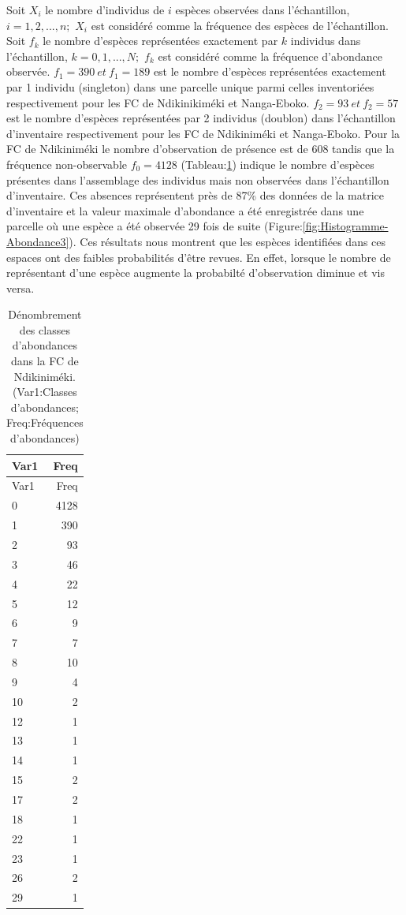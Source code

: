 \documentclass[
  12pt,
  a4paper,
  extrafontsizes,
  onecolumn,
  openright]{book}
\theoremstyle{definition}
\theoremstyle{definition}
\theoremstyle{definition}
\theoremstyle{definition}
\theoremstyle{remark}
\begin{document}
Soit \(X_i\) le nombre d'individus de \(i\) espèces observées dans l'échantillon, \(i=1,2,...,n;\) \(X_i\) est considéré comme la fréquence des espèces de l'échantillon. Soit \(f_k\) le nombre d'espèces représentées exactement par \(k\) individus dans l'échantillon, \(k=0,1,...,N;\) \(f_k\) est considéré comme la fréquence d'abondance observée. \(f_1=390\ et\ f_1=189\) est le nombre d'espèces représentées exactement par 1 individu (singleton) dans une parcelle unique parmi celles inventoriées respectivement pour les FC de Ndikinikiméki et Nanga-Eboko. \(f_2=93\ et\ f_2=57\) est le nombre d'espèces représentées par 2 individus (doublon) dans l'échantillon d'inventaire respectivement pour les FC de Ndikiniméki et Nanga-Eboko. Pour la FC de Ndikiniméki le nombre d'observation de présence est de 608 tandis que la fréquence non-observable \(f_0=4128\) (Tableau:\ref{tab:ClassesAbondance-Ndikinimeki3}) indique le nombre d'espèces présentes dans l'assemblage des individus mais non observées dans l'échantillon d'inventaire. Ces absences représentent près de 87\% des données de la matrice d'inventaire et la valeur maximale d'abondance a été enregistrée dans une parcelle où une espèce a été observée 29 fois de suite (Figure:\ref{fig:Histogramme-Abondance3}). Ces résultats nous montrent que les espèces identifiées dans ces espaces ont des faibles probabilités d'être revues. En effet, lorsque le nombre de représentant d'une espèce augmente la probabilté d'observation diminue et vis versa.

\begin{longtable}[]{@{}lr@{}}
\caption{\label{tab:ClassesAbondance-Ndikinimeki3}Dénombrement des classes d'abondances dans la FC de Ndikiniméki. (Var1:Classes d'abondances; Freq:Fréquences d'abondances)}\tabularnewline
\toprule()
Var1 & Freq \\
\midrule()
\endfirsthead
\toprule()
Var1 & Freq \\
\midrule()
\endhead
0 & 4128 \\
1 & 390 \\
2 & 93 \\
3 & 46 \\
4 & 22 \\
5 & 12 \\
6 & 9 \\
7 & 7 \\
8 & 10 \\
9 & 4 \\
10 & 2 \\
12 & 1 \\
13 & 1 \\
14 & 1 \\
15 & 2 \\
17 & 2 \\
18 & 1 \\
22 & 1 \\
23 & 1 \\
26 & 2 \\
29 & 1 \\
\bottomrule()
\end{longtable}
\end{document}
